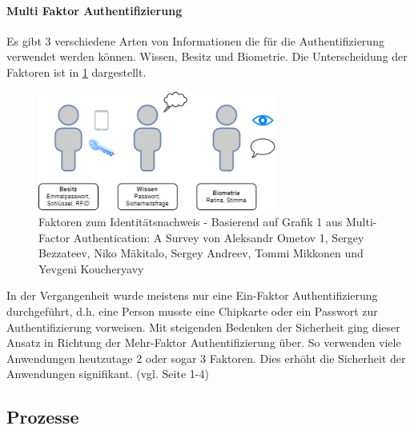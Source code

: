 \documentclass[11pt]{article}
\begin{document}
\paragraph{Multi Faktor Authentifizierung}
Es gibt 3 verschiedene Arten von Informationen die für die Authentifizierung verwendet werden können. Wissen, Besitz und Biometrie. Die Unterscheidung der Faktoren ist in \cref{figure:mfa} dargestellt.
\begin{figure}[H]
  \centering
  \includegraphics[width=0.7\textwidth]{assets/mfa.png}
  \caption{Faktoren zum Identitätsnachweis - Basierend auf Grafik 1 aus Multi-Factor Authentication: A Survey von Aleksandr Ometov 1, Sergey Bezzateev, Niko Mäkitalo, Sergey Andreev, Tommi Mikkonen und Yevgeni Koucheryavy}\label{figure:mfa}
\end{figure}
In der Vergangenheit wurde meistens nur eine Ein-Faktor Authentifizierung durchgeführt, d.h. eine Person musste eine Chipkarte oder ein Passwort zur Authentifizierung vorweisen. Mit steigenden Bedenken der Sicherheit ging dieser Ansatz in Richtung der Mehr-Faktor Authentifizierung über. So verwenden viele Anwendungen heutzutage 2 oder sogar 3 Faktoren. Dies erhöht die Sicherheit der Anwendungen signifikant. (vgl. \cite{ometov2018multi} Seite 1-4)
\subsection{Prozesse}
\end{document}
